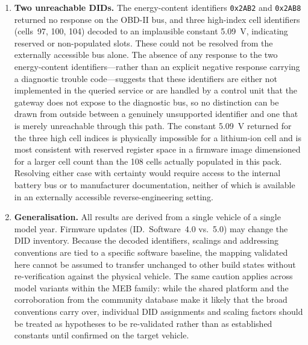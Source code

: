 \documentclass[11pt,a4paper,oneside,parskip=half]{scrreprt}
\providecommand{\hex}{}\renewcommand{\hex}[1]{\texttt{0x#1}}
\begin{document}
\begin{enumerate}
  \item \textbf{Two unreachable DIDs.} The energy-content identifiers \hex{2AB2} and \hex{2AB8} returned no response on the OBD-II bus, and three high-index cell identifiers (cells~97, 100, 104) decoded to an implausible constant 5.09~V, indicating reserved or non-populated slots. These could not be resolved from the externally accessible bus alone. The absence of any response to the two energy-content identifiers---rather than an explicit negative response carrying a diagnostic trouble code---suggests that these identifiers are either not implemented in the queried service or are handled by a control unit that the gateway does not expose to the diagnostic bus, so no distinction can be drawn from outside between a genuinely unsupported identifier and one that is merely unreachable through this path. The constant 5.09~V returned for the three high cell indices is physically impossible for a lithium-ion cell and is most consistent with reserved register space in a firmware image dimensioned for a larger cell count than the 108 cells actually populated in this pack. Resolving either case with certainty would require access to the internal battery bus or to manufacturer documentation, neither of which is available in an externally accessible reverse-engineering setting.
  \item \textbf{Generalisation.} All results are derived from a single vehicle of a single model year. Firmware updates (ID.~Software~4.0 vs.\ 5.0) may change the DID inventory. Because the decoded identifiers, scalings and addressing conventions are tied to a specific software baseline, the mapping validated here cannot be assumed to transfer unchanged to other build states without re-verification against the physical vehicle. The same caution applies across model variants within the MEB family: while the shared platform and the corroboration from the community database make it likely that the broad conventions carry over, individual DID assignments and scaling factors should be treated as hypotheses to be re-validated rather than as established constants until confirmed on the target vehicle.
\end{enumerate}
\end{document}
